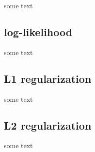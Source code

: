 \documentclass{article}
\begin{document}
	some text
	
		\subsection{log-likelihood}
		
		some text
		
		\subsection{L1 regularization}
		
		some text
		
		\subsection{L2 regularization}
		
		some text
	
%	
%	
%	
	
\end{document}
